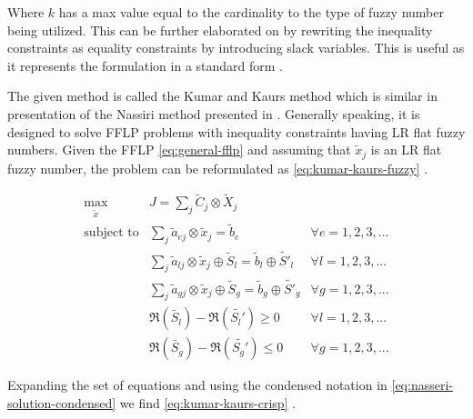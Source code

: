 \documentclass[ee,thesis]{usuthesis}
\begin{document}
Where \(k\) has a max value equal to the cardinality to the type of fuzzy number being utilized. This can be further
elaborated on by rewriting the inequality constraints as equality constraints by introducing slack variables. This is
useful as it represents the formulation in a standard form \cite{chen-2010-applied,vanderbei-2020-linear-progr}.

The given method is called the Kumar and Kaurs method \cite{kaur-2016-introd-fuzzy} which is similar in presentation of
the Nassiri method presented in \cite{bello-2019-fuzzy-activ}. Generally speaking, it is designed to solve FFLP
problems with inequality constraints having LR flat fuzzy numbers. Given the FFLP \ref{eq:general-fflp} and assuming that
\(\tilde{x}_j\) is an LR flat fuzzy number, the problem can be reformulated as \ref{eq:kumar-kaurs-fuzzy}
\cite{kaur-2016-introd-fuzzy}.

\begin{equation}
\label{eq:kumar-kaurs-fuzzy}
\begin{array}{lll}
\underset{{\tilde{x}}}{\text{max}} & J = \sum_j \tilde{C}_j \otimes \tilde{X}_j              &                                              \\
\text{subject to} & \sum_j \tilde{a}_{ej} \otimes \tilde{x}_j               = \tilde{b}_e & \forall e = 1,2,3,...                \\
                  & \sum_j \tilde{a}_{lj} \otimes \tilde{x}_j \oplus \tilde{S}_l = \tilde{b}_l \oplus \tilde{S'}_l & \forall l = 1,2,3,... \\
                  & \sum_j \tilde{a}_{gj} \otimes \tilde{x}_j \oplus \tilde{S}_g = \tilde{b}_g \oplus \tilde{S'}_g & \forall g = 1,2,3,... \\
                  & \mathfrak{R}(\tilde{S_l}) - \mathfrak{R}(\tilde{S_l'}) \ge 0                                     & \forall l = 1,2,3,...      \\
                  & \mathfrak{R}(\tilde{S_g}) - \mathfrak{R}(\tilde{S_g'}) \le 0                                     & \forall g = 1,2,3,...
\end{array}
\end{equation}

Expanding the set of equations and using the condensed notation in \ref{eq:nasseri-solution-condensed} we find
\ref{eq:kumar-kaurs-crisp} \cite{kaur-2016-introd-fuzzy}.
\end{document}
